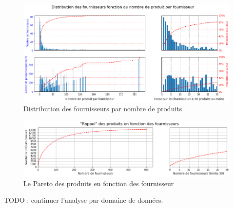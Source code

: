                 \begin{figure}[htbp]
                    \begin{center}
                    \includegraphics[width=\linewidth]{img/distribution_fournisseurs_par_prd_count.png}
                    \end{center}
                    \caption{Distribution des fournisseurs par nombre de produits}
                    \label{fig:distrib_fourn_pdts}
                \end{figure}

                \begin{figure}[htbp]
                    \begin{center}
                    \includegraphics[width=\linewidth]{img/rappel_produit_par_fournisseur.png}
                    \end{center}
                    \caption{Le Pareto des produits en fonction des fournisseur}
                    \label{fig:rappel_pdt_par_frn}
                \end{figure}

        TODO : continuer l'analyse par domaine de données.

